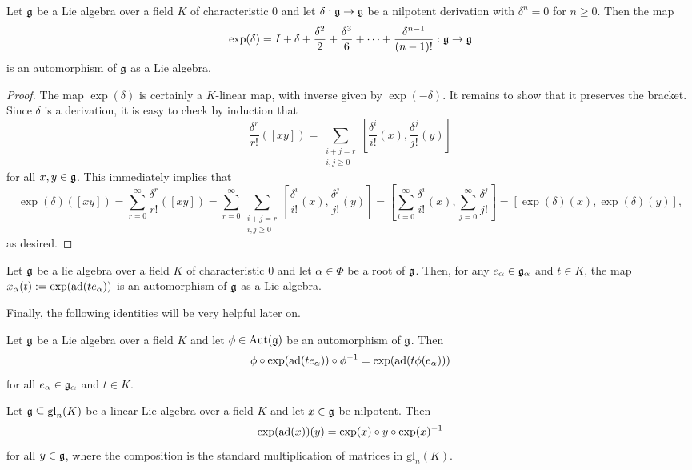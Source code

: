 \begin{proposition}
Let $\mathfrak{g}$ be a Lie algebra over a field $K$ of characteristic $0$ and let $\delta:\mathfrak{g}\to\mathfrak{g}$ be a nilpotent derivation with $\delta^n=0$ for $n\geq 0$. Then the map $$\exp(\delta)=I+\delta+\frac{\delta^2}{2}+\frac{\delta^3}{6}+\dots+\frac{\delta^{n-1}}{(n-1)!}:\mathfrak{g}\rightarrow\mathfrak{g}$$
is an automorphism of $\mathfrak{g}$ as a Lie algebra.
\end{proposition}
\begin{proof}
    The map $\exp(\delta)$ is certainly a $K$-linear map, with inverse given by $\exp(-\delta)$. It remains to show that it preserves the bracket. Since $\delta$ is a derivation, it is easy to check by induction that 
    $$\frac{\delta^r}{r!}([xy])=\sum_{\substack{i+j=r \\ i,j\geq 0}}\left[\frac{\delta^i}{i!}(x),\frac{\delta^{j}}{j!}(y)\right]$$ 
    for all $x,y\in\mathfrak{g}$. This immediately implies that
    $$\exp(\delta)([xy])=\sum_{r=0}^{\infty}\frac{\delta^r}{r!}([xy])=\sum_{r=0}^{\infty}\sum_{\substack{i+j=r \\ i,j\geq 0}}\left[\frac{\delta^i}{i!}(x),\frac{\delta^{j}}{j!}(y)\right]=\left[\sum_{i=0}^\infty\frac{\delta^i}{i!}(x),\sum_{j=0}^{\infty}\frac{\delta^j}{j!}\right]=[\exp(\delta)(x),\exp(\delta)(y)],$$
    as desired.
\end{proof}
\begin{cor}\label{cor:xalpha_automorphism}
    Let $\mathfrak{g}$ be a lie algebra over a field $K$ of characteristic $0$ and let $\alpha\in\Phi$ be a root of $\mathfrak{g}$. Then, for any $e_\alpha\in\mathfrak{g}_\alpha$ and $t\in K$, the map $x_\alpha(t):=\exp(\mathrm{ad}(te_\alpha))$ is an automorphism of $\mathfrak{g}$ as a Lie algebra.
\end{cor}

Finally, the following identities will be very helpful later on.
\begin{lemma}\label{lem:conjxalpla}
    Let $\mathfrak{g}$ be a Lie algebra over a field $K$ and let $\phi\in\mathrm{Aut}(\mathfrak{g})$ be an automorphism of $\mathfrak{g}$. Then
    $$\phi\circ\exp(\mathrm{ad}(te_\alpha))\circ\phi^{-1}=\exp(\mathrm{ad}(t\phi(e_\alpha)))$$
    for all $e_\alpha\in\mathfrak{g}_\alpha$ and $t\in K$.
\end{lemma}

\begin{lemma}\label{lem:identityexp}
    Let $\mathfrak{g}\subseteq\mathrm{gl}_n(K)$ be a linear Lie algebra over a field $K$ and let $x\in\mathfrak{g}$ be nilpotent. Then 
    $$\exp(\mathrm{ad}(x))(y)=\exp(x)\circ y\circ \exp(x)^{-1}$$
    for all $y\in\mathfrak{g}$, where the composition is the standard multiplication of matrices in $\mathrm{gl}_n(K)$.
\end{lemma}

